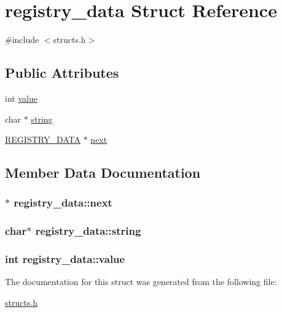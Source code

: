 \hypertarget{structregistry__data}{\section{registry\-\_\-data Struct Reference}
\label{structregistry__data}
}


{\ttfamily \#include $<$structs.\-h$>$}

\subsection*{Public Attributes}
\begin{DoxyCompactItemize}
\item 
int \hyperlink{structregistry__data_aa6a3b25fc21926bb3cc42575706f9e94}{value}
\item 
char $\ast$ \hyperlink{structregistry__data_a10a80c5a1f3cdf3d22528c76e8cdad7a}{string}
\item 
\hyperlink{structs_8h_ae07fc4b53299890083903dd96e19bfc9}{R\-E\-G\-I\-S\-T\-R\-Y\-\_\-\-D\-A\-T\-A} $\ast$ \hyperlink{structregistry__data_a74fd1cf4f25dac4d6895ef61a050e465}{next}
\end{DoxyCompactItemize}


\subsection{Member Data Documentation}
\hypertarget{structregistry__data_a74fd1cf4f25dac4d6895ef61a050e465}{
\subsubsection[{next}]{$\ast$ registry\-\_\-data\-::next}}\label{structregistry__data_a74fd1cf4f25dac4d6895ef61a050e465}
\hypertarget{structregistry__data_a10a80c5a1f3cdf3d22528c76e8cdad7a}{
\subsubsection[{string}]{\setlength{\rightskip}{0pt plus 5cm}char$\ast$ registry\-\_\-data\-::string}}\label{structregistry__data_a10a80c5a1f3cdf3d22528c76e8cdad7a}
\hypertarget{structregistry__data_aa6a3b25fc21926bb3cc42575706f9e94}{
\subsubsection[{value}]{\setlength{\rightskip}{0pt plus 5cm}int registry\-\_\-data\-::value}}\label{structregistry__data_aa6a3b25fc21926bb3cc42575706f9e94}


The documentation for this struct was generated from the following file\-:\begin{DoxyCompactItemize}
\item 
\hyperlink{structs_8h}{structs.\-h}\end{DoxyCompactItemize}
